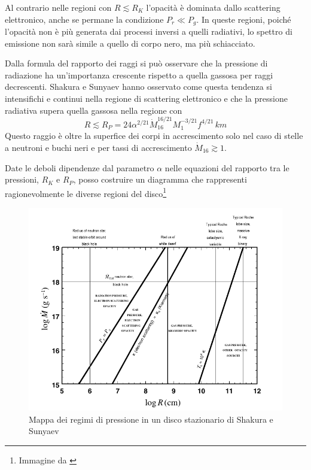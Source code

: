 \documentclass[a4paperbi]{article}
\begin{document}
	Al contrario nelle regioni con $R\lesssim R_K$ l'opacità è dominata dallo scattering elettronico, anche se permane la condizione $P_r\ll P_g$. In queste regioni, poiché l'opacità non è più generata dai processi inversi a quelli radiativi, lo spettro di emissione non sarà simile a quello di corpo nero, ma più schiacciato.
	
	Dalla formula del rapporto dei raggi si può osservare che la pressione di radiazione ha un'importanza crescente rispetto a quella gassosa per raggi decrescenti. Shakura e Sunyaev hanno osservato come questa tendenza si intensifichi e continui nella regione di scattering elettronico e che la pressione radiativa supera quella gassosa nella regione con
	\begin{equation}
		R\lesssim R_P=24\alpha^{2/21}\dot{M}^{16/21}_{16}M^{-3/21}_1f^{4/21}\,km
	\end{equation}
	Questo raggio è oltre la superfice dei corpi in accrescimento solo nel caso di stelle a neutroni e buchi neri e per tassi di accrescimento $\dot{M}_{16}\gtrsim 1$.
	
	Date le deboli dipendenze dal parametro $\alpha$ nelle equazioni del rapporto tra le pressioni, $R_K$ e $R_P$, posso costruire un diagramma che rappresenti ragionevolmente le diverse regioni del disco\footnote{Immagine da \cite{FrankKingRaineAccretionPower}}
	
	\begin{figure}[H]
		\centering
		\includegraphics[width=1\linewidth]{MappaPressione}
		\caption{Mappa dei regimi di pressione in un disco stazionario di Shakura e Sunyaev}
		\label{fig:MappaPressione}
	\end{figure}
	
\end{document}
